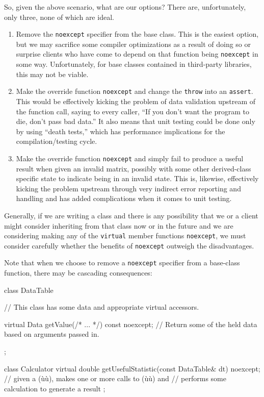 So, given the above scenario, what are our options? There are,
unfortunately, only three, none of which are ideal.
\begin{enumerate}
\item{Remove the \lstinline!noexcept! specifier from the base class. This is the easiest option, but we may sacrifice some compiler optimizations as a result of doing so or surprise clients who have come to depend on that function being \lstinline!noexcept! in some way. Unfortunately, for base classes contained in third-party libraries, this may not be viable.}
\item{Make the override function \lstinline!noexcept! and change the \lstinline!throw! into an \lstinline!assert!. This would be effectively kicking the problem of data validation upstream of the function call, saying to every caller, ``If you don’t want the program to die, don’t pass bad data.'' It also means that unit testing could be done only by using ``death tests,'' which has performance implications for the compilation/testing cycle.}
\item{Make the override function \lstinline!noexcept! and simply fail to produce a useful result when given an invalid matrix, possibly with some other derived-class specific state to indicate being in an invalid state. This is, likewise, effectively kicking the problem upstream through very indirect error reporting and handling and has added complications when it comes to unit testing.}
\end{enumerate}
Generally, if we are writing a class and there is any possibility that
we or a client might consider inheriting from that class now or in the
future and we are considering making any of the \lstinline!virtual! member
functions \lstinline!noexcept!, we must consider carefully whether the
benefits of \lstinline!noexcept! outweigh the disadvantages.

Note that when we choose to remove a \lstinline!noexcept! specifier from a
base-class function, there may be cascading consequences:

\begin{emcppslisting}
class DataTable
{
    // This class has some data and appropriate virtual accessors.

    virtual Data getValue(/* ... */) const noexcept;
        // Return some of the held data based on arguments passed in.
};

class Calculator
{
    virtual double getUsefulStatistic(const DataTable& dt) noexcept;
        // given a (ù{}ù), makes one or more calls to (ù{}ù) and
        // performs some calculation to generate a result
};
\end{emcppslisting}
    

